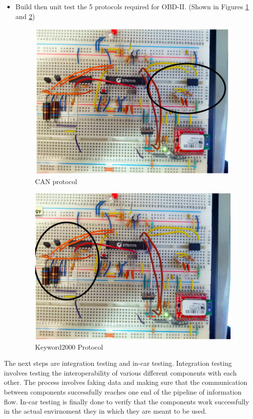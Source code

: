 \documentclass[12pt,letterpaper]{article}
\begin{document}
\begin{itemize}
\item Build then unit test the 5 protocols required for OBD-II. (Shown in Figures \ref{fig:canprotocol} and \ref{fig:kwprotocol})
\begin{figure}[H]
\centering
\includegraphics[page=1, totalheight=7cm]{images/canprotocol.png}
\caption{CAN protocol}
\label{fig:canprotocol}
\end{figure}\begin{figure}[H]
\centering
\includegraphics[page=1, totalheight=7cm]{images/kwp.png}
\caption{Keyword2000 Protocol}
\label{fig:kwprotocol}
\end{figure}
\end{itemize}

The next steps are integration testing and in-car testing. Integration testing involves testing the interoperability of various different components with each other. The process involves faking data and making sure that the communication between components successfully reaches one end of the pipeline of information flow. In-car testing is finally done to verify that the components work successfully in the actual envirnoment they in which they are meant to be used.
\end{document}
